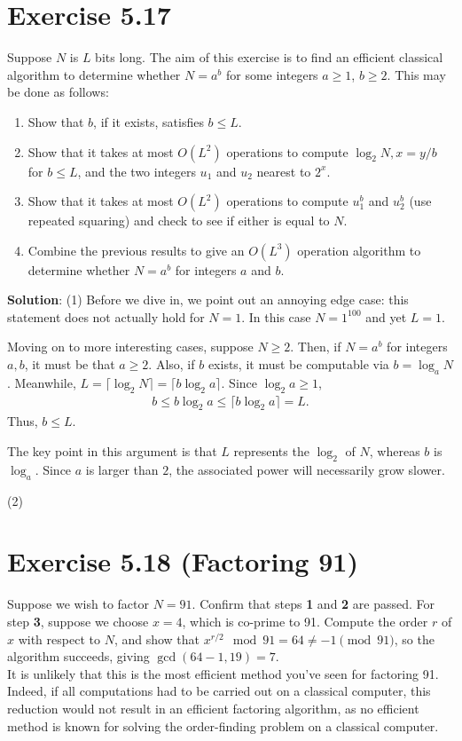 \documentclass{book}
\begin{document}
\section*{Exercise 5.17}
    Suppose $N$ is $L$ bits long. The aim of this exercise is to find an efficient classical algorithm to determine whether $N=a^b$ for some integers $a\geq 1$, $b \geq 2$. This may be done as follows:
    \begin{enumerate}
        \item Show that $b$, if it exists, satisfies $b\leq L$.
        \item Show that it takes at most $O(L^2)$ operations to compute $\log_2 N, x = y/b$ for $b \leq L$, and the two integers $u_1$ and $u_2$ nearest to $2^x$.
        \item Show that it takes at most $O(L^2)$ operations to compute $u_1^b$ and $u_2^b$ (use repeated squaring) and check to see if either is equal to $N$.
        \item Combine the previous results to give an $O(L^3)$ operation algorithm to determine whether $N = a^b$ for integers $a$ and $b$.
    \end{enumerate}

    \textbf{Solution}:
    (1) Before we dive in, we point out an annoying edge case: this statement does not actually hold for $N =1$. In this case $N = 1^{100}$ and yet $L = 1$. 
    
    Moving on to more interesting cases, suppose $N \geq 2$. Then, if $N = a^b$ for integers $a, b$, it must be that $a \geq 2$. Also, if $b$ exists, it must be computable via $b = \log_a N$. Meanwhile,  $L = \lceil\log_2 N\rceil = \lceil b \log_2 a \rceil$. Since $\log_2 a \geq 1$,
    \begin{align}
        b \leq b \log_2 a \leq \lceil b \log_2 a \rceil = L.
    \end{align}
    Thus, $b \leq L$. 
    
    The key point in this argument is that $L$ represents the $\log_2$ of $N$, whereas $b$ is $\log_a$. Since $a$ is larger than $2$, the associated power will necessarily grow slower. 
    
    (2)
    
\section*{Exercise 5.18 (Factoring 91)}
    Suppose we wish to factor $N = 91$. Confirm that steps \textbf{1} and \textbf{2} are passed. For step \textbf{3}, suppose we choose $x = 4$, which is co-prime to 91. Compute the order $r$ of $x$ with respect to $N$, and show that $x^{r/2} \mod 91 = 64 \neq -1\pmod{91}$, so the algorithm succeeds, giving $\gcd(64-1,19)=7$.\\
    It is unlikely that this is the most efficient method you’ve seen for factoring 91. Indeed, if all computations had to be carried out on a classical computer, this reduction would not result in an efficient factoring algorithm, as no efficient method is known for solving the order-finding problem on a classical computer.
    
\end{document}
